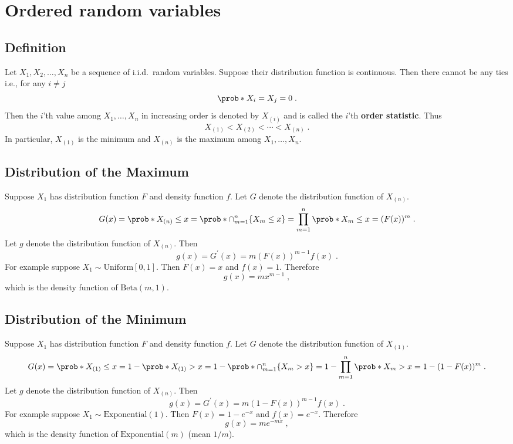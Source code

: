 \chapter{Ordered random variables}

\section{Definition}

Let $X_1,X_2,\ldots,X_n$ be a sequence of i.i.d.\ random variables. 
Suppose their distribution function is continuous.
Then there cannot be any ties i.e., for any $i\neq j$
\[
\prob*{X_i = X_j } = 0 \;.
\]
Then the $i$'th value among $X_1,\ldots,X_n$ in increasing order is
denoted by $X_{(i)}$ and is called the $i$'th \textbf{order statistic}. 
Thus 
\[
X_{(1)} < X_{(2)} < \cdots < X_{(n)}\;.
\]
In particular, $X_{(1)}$ is the minimum and $X_{(n)}$ is the maximum among $X_1,\ldots,X_n$. 

\section{Distribution of the Maximum}

Suppose $X_1$ has distribution function $F$ and density function $f$. Let $G$ denote the distribution function of $X_{(n)}$.
\[
G(x)=\prob*{X_{(n)}\leq x} = \prob*{\cap_{m=1}^n\{X_m\leq x\}} = \prod_{m=1}^n \prob*{X_m\leq x} = (F(x))^m\;.
\]
Let $g$ denote the distribution function of $X_{(n)}$. Then
\[
g(x) = G^\prime(x) = m (F(x))^{m-1} f(x) \;.
\]
For example suppose $X_1\sim\mathrm{Uniform}[0,1]$. Then $F(x)=x$ and $f(x)=1$. Therefore 
\[
g(x)=m x^{m-1} \;,
\]
which is the density function of $\mathrm{Beta}(m,1)$.

\section{Distribution of the Minimum}

Suppose $X_1$ has distribution function $F$ and density function $f$. Let $G$ denote the distribution function of $X_{(1)}$.
\[
G(x)=\prob*{X_{(1)}\leq x} = 1-\prob*{X_{(1)}>x} = 1-\prob*{\cap_{m=1}^n\{X_m>x\}} = 1-\prod_{m=1}^n \prob*{X_m>x} = 1-(1-F(x))^m\;.
\]
Let $g$ denote the distribution function of $X_{(n)}$. Then
\[
g(x) = G^\prime(x) = m (1-F(x))^{m-1} f(x) \;.
\]
For example suppose $X_1\sim\mathrm{Exponential}(1)$. Then $F(x)=1-e^{-x}$ and $f(x)=e^{-x}$. Therefore 
\[
g(x)=m e^{-mx} \;,
\]
which is the density function of $\mathrm{Exponential}(m)$ (mean $1/m$).

